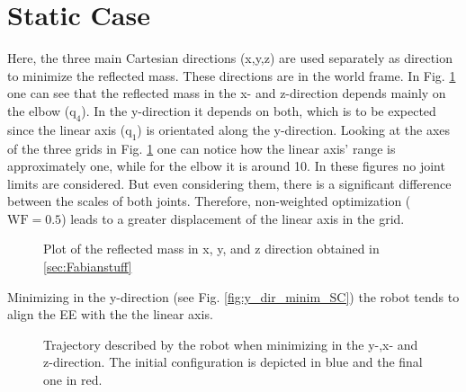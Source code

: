 \section{Static Case} 
\label{sec:static_case}







Here, the three main Cartesian directions (x,y,z) are used separately as direction to minimize the reflected mass. These directions are in the world frame. In Fig. \ref{fig:reflected_mass_cart_directions}  one can see that the reflected mass in the x- and z-direction depends mainly on the elbow ($\mathrm{q_4}$). In the y-direction it depends on both, which is to be expected since the linear axis ($\mathrm{q_1}$) is orientated along the y-direction. Looking at the axes of the three grids in Fig. \ref{fig:reflected_mass_cart_directions} one can notice how the linear axis' range is approximately one, while for the elbow it is around 10. In these figures no joint limits are considered. But even considering them, there is a significant difference between the scales of both joints. Therefore, non-weighted  optimization ($\mathrm{WF = 0.5}$) leads to a greater displacement of the linear axis in the grid. \\
%
\begin{figure}[htp!]
	\centering	
	 	 	
	\caption{Plot of the reflected mass in x, y, and z direction obtained in \ref{sec:Fabianstuff}}
	\label{fig:reflected_mass_cart_directions}
\end{figure}
%
%
Minimizing in the y-direction (see Fig. \ref{fig:y_dir_minim_SC}) the robot tends to align the EE with the the linear axis.
\begin{figure}[htp!]
	\centering	
	 	 	
	\caption{Trajectory described by the robot when minimizing in the y-,x- and z-direction. The initial configuration is depicted in blue and the final one in red. }
	\label{fig:dir_minim_SC}
\end{figure}

